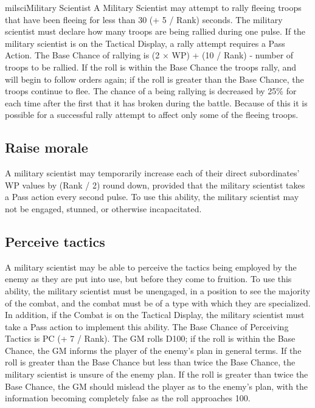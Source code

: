 \begin{Skill}[2.1]{milsci}{Military Scientist}
A Military Scientist may attempt to rally fleeing troops that have
been fleeing for less than 30 (+ 5 / Rank) seconds.  The military
scientist must declare how many troops are being rallied during one
pulse.  If the military scientist is on the Tactical Display, a rally
attempt requires a Pass Action. The Base Chance of rallying is (2 ×
WP) + (10 / Rank) - number of troops to be rallied. If the roll is
within the Base Chance the troops rally, and will begin to follow
orders again; if the roll is greater than the Base Chance, the troops
continue to flee.  The chance of a being rallying is decreased by 25\%
for each time after the first that it has broken during the battle.
Because of this it is possible for a successful rally attempt to
affect only some of the fleeing troops.


\subsection{Raise morale}

A military scientist may temporarily increase each of their direct
subordinates’ WP values by (Rank / 2) round down, provided that the
military scientist takes a Pass action every second pulse. To use this
ability, the military scientist may not be engaged, stunned, or
otherwise incapacitated.

\subsection{Perceive tactics}

A military scientist may be able to perceive the tactics being
employed by the enemy as they are put into use, but before they come
to fruition.  To use this ability, the military scientist must be
unengaged, in a position to see the majority of the combat, and the
combat must be of a type with which they are specialized.  In
addition, if the Combat is on the Tactical Display, the military
scientist must take a Pass action to implement this ability.  The Base
Chance of Perceiving Tactics is PC (+ 7 / Rank). The GM rolls D100; if
the roll is within the Base Chance, the GM informs the player of the
enemy’s plan in general terms. If the roll is greater than the Base
Chance but less than twice the Base Chance, the military scientist is
unsure of the enemy plan. If the roll is greater than twice the Base
Chance, the GM should mislead the player as to the enemy’s plan, with
the information becoming completely false as the roll approaches 100.


\end{Skill}
